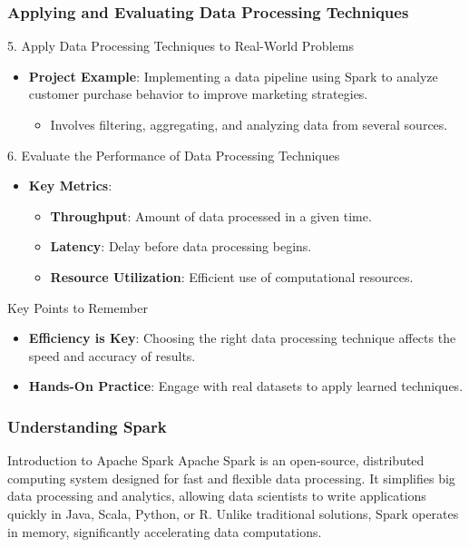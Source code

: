 \documentclass[aspectratio=169]{beamer}
\begin{document}
\begin{frame}[fragile]
    \frametitle{Applying and Evaluating Data Processing Techniques}
    \begin{block}{5. Apply Data Processing Techniques to Real-World Problems}
        \begin{itemize}
            \item \textbf{Project Example}: Implementing a data pipeline using Spark to analyze customer purchase behavior to improve marketing strategies. 
            \begin{itemize}
                \item Involves filtering, aggregating, and analyzing data from several sources.
            \end{itemize}
        \end{itemize}
    \end{block}

    \begin{block}{6. Evaluate the Performance of Data Processing Techniques}
        \begin{itemize}
            \item \textbf{Key Metrics}:
                \begin{itemize}
                    \item \textbf{Throughput}: Amount of data processed in a given time.
                    \item \textbf{Latency}: Delay before data processing begins.
                    \item \textbf{Resource Utilization}: Efficient use of computational resources.
                \end{itemize}
        \end{itemize}
    \end{block}

    \begin{block}{Key Points to Remember}
        \begin{itemize}
            \item \textbf{Efficiency is Key}: Choosing the right data processing technique affects the speed and accuracy of results.
            \item \textbf{Hands-On Practice}: Engage with real datasets to apply learned techniques.
        \end{itemize}
    \end{block}
\end{frame}

\begin{frame}[fragile]
  \frametitle{Understanding Spark}
  \begin{block}{Introduction to Apache Spark}
    Apache Spark is an open-source, distributed computing system designed for fast and flexible data processing. It simplifies big data processing and analytics, allowing data scientists to write applications quickly in Java, Scala, Python, or R. Unlike traditional solutions, Spark operates in memory, significantly accelerating data computations.
  \end{block}
\end{frame}
\end{document}
